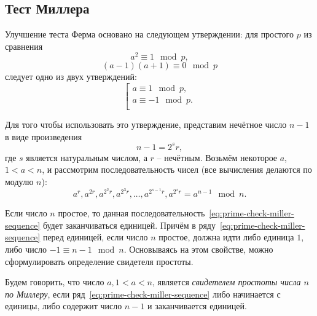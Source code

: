 \subsection{Тест Миллера}\label{section-prime-check-miller}

Улучшение теста Ферма основано на следующем утверждении: для простого $p$ из сравнения
    \[ a^2 \equiv 1 \mod p, \]
    \[ (a-1)(a+1) \equiv 0 \mod p \]
следует одно из двух утверждений: 
\[ \left[ \begin{array}{l}
     a \equiv 1 \mod p, \\
     a \equiv -1 \mod p. \\
\end{array} \right. \]

Для того чтобы использовать это утверждение, представим нечётное число $n - 1$ в виде произведения
    \[ n-1 = 2^s r, \]
где $s$ является натуральным числом, а $r$ -- нечётным. Возьмём некоторое $a$, $1 < a < n$, и рассмотрим последовательность чисел (все вычисления делаются по модулю $n$):
\begin{equation}\label{eq:prime-check-miller-sequence}
	a^{r}, a^{2r}, a^{2^2 r}, a^{2^3 r}, \dots, a^{2^{s-1} r}, a^{2^s r} = a^{n-1} \mod n.
\end{equation}

Если число $n$ простое, то данная последовательность~\ref{eq:prime-check-miller-sequence} будет заканчиваться единицей. Причём в ряду~\ref{eq:prime-check-miller-sequence} перед единицей, если число $n$ простое, должна идти либо единица $1$, либо число $-1 \equiv n-1 \mod n$. Основываясь на этом свойстве, можно сформулировать определение свидетеля простоты.

Будем говорить, что число $a, 1 < a < n$, является \emph{свидетелем простоты числа $n$ по Миллеру}, если ряд~\ref{eq:prime-check-miller-sequence} либо начинается с единицы, либо содержит число $n-1$ и заканчивается единицей.

